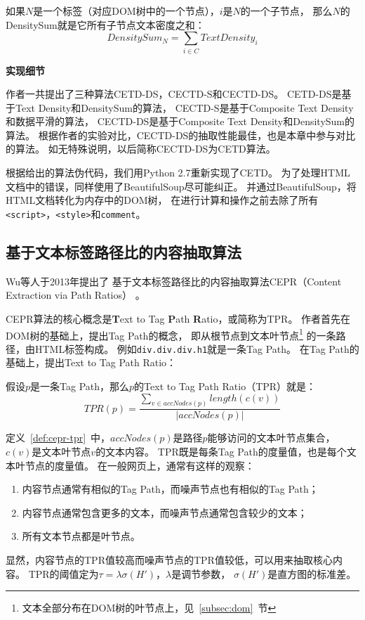 \begin{definition}
\label{def:cetd-densitysum}
如果$N$是一个标签（对应DOM树中的一个节点），$i$是$N$的一个子节点，
那么$N$的DensitySum就是它所有子节点文本密度之和：
\begin{equation}
DensitySum_N = \sum_{i \in C} TextDensity_i
\end{equation}
\end{definition}

\textbf{实现细节}

作者一共提出了三种算法CETD-DS，CECTD-S和CECTD-DS。
CETD-DS是基于Text Density和DensitySum的算法，
CECTD-S是基于Composite Text Density和数据平滑的算法，
CECTD-DS是基于Composite Text Density和DensitySum的算法。
根据作者的实验对比，CECTD-DS的抽取性能最佳，也是本章中参与对比的算法。
如无特殊说明，以后简称CECTD-DS为CETD算法。

根据\cite{sun2011dom}给出的算法伪代码，我们用Python 2.7重新实现了CETD。
为了处理HTML文档中的错误，同样使用了BeautifulSoup尽可能纠正。
并通过BeautifulSoup，将HTML文档转化为内存中的DOM树，
在进行计算和操作之前去除了所有\texttt{<script>}，\texttt{<style>}和\texttt{comment}。

\subsection{基于文本标签路径比的内容抽取算法}
Wu等人于2013年提出了
基于文本标签路径比的内容抽取算法CEPR（Content Extraction via Path Ratios）
。

CEPR算法的核心概念是\textbf{T}ext to Tag \textbf{P}ath \textbf{R}atio，或简称为TPR。
作者首先在DOM树的基础上，提出Tag Path的概念，
即从根节点到文本叶节点\footnote{文本全部分布在DOM树的叶节点上，见~\ref{subsec:dom}~节}
的一条路径，由HTML标签构成。
例如\texttt{div.div.div.h1}就是一条Tag Path。
在Tag Path的基础上，提出Text to Tag Path Ratio：

\begin{definition}
\label{def:cepr-tpr}
假设$p$是一条Tag Path，那么$p$的Text to Tag Path Ratio（TPR）就是：
\begin{equation}
TPR(p) = \frac{\sum_{v \in accNodes(p)}length(c(v))}{\vert accNodes(p) \vert}
\end{equation}
\end{definition}

定义~\ref{def:cepr-tpr}~中，$accNodes(p)$是路径$p$能够访问的文本叶节点集合，
$c(v)$是文本叶节点$v$的文本内容。
TPR既是每条Tag Path的度量值，也是每个文本叶节点的度量值。
在一般网页上，通常有这样的观察：
\begin{enumerate}
\item 内容节点通常有相似的Tag Path，而噪声节点也有相似的Tag Path；
\item 内容节点通常包含更多的文本，而噪声节点通常包含较少的文本；
\item 所有文本节点都是叶节点。
\end{enumerate}
显然，内容节点的TPR值较高而噪声节点的TPR值较低，可以用来抽取核心内容。
TPR的阈值定为$\tau = \lambda \sigma(H')$，$\lambda$是调节参数，
$\sigma(H')$是直方图的标准差。

